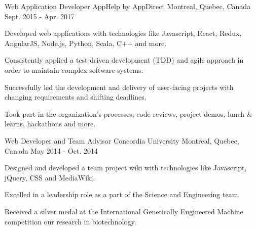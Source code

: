 

\begin{cventries}

  \cventry
  {\small Web Application Developer} %
  {\normalsize AppHelp by AppDirect} %
  {\small Montreal, Quebec, Canada} %
  {\small Sept. 2015 - Apr. 2017 } %
    {
      \begin{cvitems} %
      \item \small Developed web applications with technologies like Javascript, React, Redux, AngularJS, Node.js, Python, Scala, C++ and more.
      \item \small Consistently applied a test-driven development (TDD) and agile approach in order to maintain complex software systems.
      \item \small Successfully led the development and delivery of user-facing projects with changing requirements and shifting deadlines.
      \item \small Took part in the organization's processes, code reviews, project demos, lunch \& learns, hackathons and more.
      \end{cvitems}
    }

  \cventry
  {\small Web Developer and Team Advisor} %
  {\normalsize Concordia University} %
    {\small Montreal, Quebec, Canada} %
    {\small May 2014 - Oct. 2014} %
    {
      \begin{cvitems} %
      \item \small Designed and developed a team project wiki with technologies like Javascript, jQuery, CSS and MediaWiki.
      \item \small Excelled in a leadership role as a part of the Science and Engineering team.
      \item \small Received a silver medal at the International Genetically Engineered Machine competition our research in biotechnology.
      \end{cvitems}
    }


\end{cventries}
